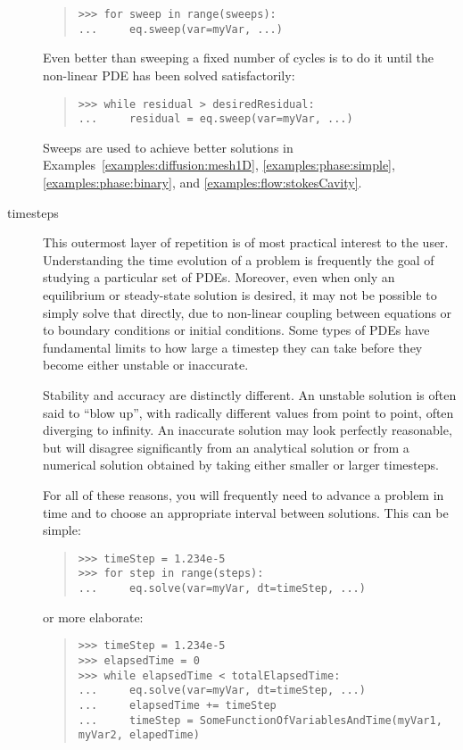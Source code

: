 \begin{description}
\begin{quote}
\begin{verbatim}
>>> for sweep in range(sweeps):
...     eq.sweep(var=myVar, ...)
\end{verbatim}
        \end{quote}
        Even better than sweeping a fixed number of cycles is to do it 
        until the non-linear PDE has been solved satisfactorily:
        \begin{quote}
\begin{verbatim}
>>> while residual > desiredResidual:
...     residual = eq.sweep(var=myVar, ...)
\end{verbatim}
        \end{quote}
        Sweeps are used to achieve better solutions in
        Examples~\ref{examples:diffusion:mesh1D}, 
        \ref{examples:phase:simple}, 
        \ref{examples:phase:binary}, and \ref{examples:flow:stokesCavity}.

        \item[timesteps] This outermost layer of repetition is of most
        practical interest to the user. Understanding the time
        evolution of a problem is frequently the goal of studying a
        particular set of PDEs. Moreover, even when only an
        equilibrium or steady-state solution is desired, it may not be
        possible to simply solve that directly, due to non-linear
        coupling between equations or to boundary conditions or
        initial conditions. Some types of PDEs have fundamental 
        limits to how large a timestep they can take before they 
        become either unstable or inaccurate.
        \begin{reSTadmonition}[Note]
        Stability and accuracy are distinctly different. An unstable 
        solution is often said to ``blow up'', with radically 
        different values from point to point, often diverging to 
        infinity. An inaccurate solution may look perfectly 
        reasonable, but will disagree significantly from an 
        analytical solution or from a numerical solution obtained by 
        taking either smaller or larger timesteps. 
        \end{reSTadmonition}
        For all of these reasons, you will frequently need to advance
        a problem in time and to choose an appropriate interval
        between solutions. This can be simple:
        \begin{quote}
\begin{verbatim}
>>> timeStep = 1.234e-5
>>> for step in range(steps):
...     eq.solve(var=myVar, dt=timeStep, ...)
\end{verbatim}
        \end{quote}
        or more elaborate:
        \begin{quote}
\begin{verbatim}
>>> timeStep = 1.234e-5
>>> elapsedTime = 0
>>> while elapsedTime < totalElapsedTime:
...     eq.solve(var=myVar, dt=timeStep, ...)
...     elapsedTime += timeStep
...     timeStep = SomeFunctionOfVariablesAndTime(myVar1, myVar2, elapedTime)
\end{verbatim}
        \end{quote}


\end{description}
